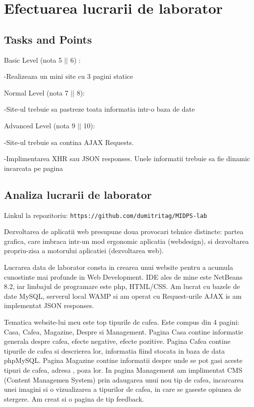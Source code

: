 \section{Efectuarea lucrarii de laborator}



\subsection{Tasks and Points}



Basic Level (nota 5 $||$ 6) : 

-Realizeaza un mini site cu 3 pagini statice


Normal Level (nota 7 $||$ 8):

-Site-ul trebuie sa pastreze toata informatia intr-o baza de date


Advanced Level (nota 9 $||$ 10):

-Site-ul trebuie sa contina AJAX Requests.

-Implimentarea XHR sau JSON responses. Unele informatii trebuie sa fie dinamic incarcata pe pagina

\subsection{Analiza lucrarii de laborator}


Linkul la repozitoriu: \texttt{https://github.com/dumitritag/MIDPS-lab}


Dezvoltarea de aplicatii web presupune doua provocari tehnice distincte: partea grafica, care imbraca intr-un mod ergonomic aplicatia (webdesign), si dezvoltarea propriu-zisa a motorului aplicatiei (dezvoltarea web).

Lucrarea data de laborator consta in crearea unui website pentru a acumula cunostinte mai profunde in Web Development. IDE ales de mine este NetBeans 8.2, iar limbajul de programare este php, HTML/CSS. Am lucrat cu bazele de date MySQL, serverul local WAMP si am operat cu Request-urile AJAX is am implementat JSON responses. 

Tematica website-lui meu este top tipurile de cafea. Este compus din 4 pagini: Casa, Cafea, Magazine, Despre si Management. Pagina Casa contine informatie generala despre cafea, efecte negative, efecte pozitive. Pagina Cafea contine tipurile de cafea si descrierea lor, informatia fiind stocata in baza de data phpMySQL. Pagina Magazine contine informatii despre unde se pot gasi aceste tipuri de cafea, adresa , poza lor. In pagina Management am implimentat CMS (Content Managemen System) prin adaugarea unui nou tip de cafea, incarcarea unei imagini si o vizualizarea a tipurilor de cafea, in care se gaseste opiunea de stergere. Am creat si o pagina de tip feedback.



